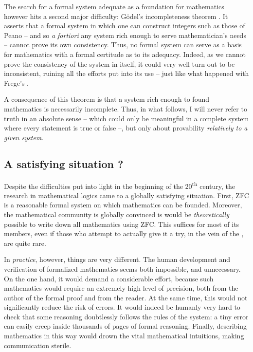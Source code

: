 The search for a formal system adequate as a foundation for mathematics however hits a
second major difficulty: Gödel’s incompleteness theorem . It asserts
that a formal system in which one can construct integers such as those of Peano – and so
\textit{a fortiori} any system rich enough to serve mathematician’s needs – cannot
prove its own consistency. Thus, no formal system can serve as a basis for mathematics
with a formal certitude as to its adequacy.
Indeed, as we cannot prove the consistency of the system in itself, it could very well
turn out to be inconsistent, ruining all the efforts put into its use – just like what
happened with Frege’s .

A consequence of this theorem is that a system rich enough to found mathematics is
necessarily incomplete.%
Thus, in what follows, I will never refer to truth in an absolute sense – which could
only be meaningful in a complete system where every statement is true or false –, but
only about provability \emph{relatively to a given system}.

\subsection{A satisfying situation ?}

Despite the difficulties put into light in the beginning of the 20\textsuperscript{th}
century, the research in mathematical logics came to a globally satisfying situation.
First, ZFC is a reasonable formal system on which mathematics can be founded. Moreover,
the mathematical community is globally convinced is would be \emph{theoretically} possible
to write down all mathematics using ZFC. This suffices for most of its members,
even if those who attempt to actually give it a try, in the vein of the
, are quite rare.

In \emph{practice}, however, things are very different. The human development and
verification of formalized mathematics%
seems both impossible, and unnecessary.
On the one hand, it would demand a considerable effort, because such mathematics would
require an extremely high level of precision, both from the author of the formal proof
and from the reader. At the same time, this would not significantly reduce the risk of
errors. It would indeed be humanly very hard to check that some reasoning doubtlessly
follows the rules of the system: a tiny error can easily creep inside thousands of pages
of formal reasoning. Finally, describing mathematics in this way would drown the vital
mathematical intuitions, making communication sterile.

